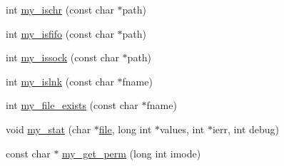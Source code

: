 \begin{DoxyCompactItemize}
\item 
int \hyperlink{C-M__system_8c_ae59ec13b3517e84ddd30a0cd5352a01d}{my\+\_\+ischr} (const char $\ast$path)
\item 
int \hyperlink{C-M__system_8c_ac4f0c51cc048efce7cc88a80c6ce50a4}{my\+\_\+isfifo} (const char $\ast$path)
\item 
int \hyperlink{C-M__system_8c_a090bd041de7e5661c0cb3dea61517283}{my\+\_\+issock} (const char $\ast$path)
\item 
int \hyperlink{C-M__system_8c_a5d15b99bbdd2c6d3e07c92b4bdebb732}{my\+\_\+islnk} (const char $\ast$fname)
\item 
int \hyperlink{C-M__system_8c_afc05a3ec2be734d741c384e752f96b90}{my\+\_\+file\+\_\+exists} (const char $\ast$fname)
\item 
void \hyperlink{C-M__system_8c_a93aa717690d60568cf019988f6434ba5}{my\+\_\+stat} (char $\ast$\hyperlink{what__overview_81_8txt_a447b56c526e8da30e0dc94673727ee25}{file}, long int $\ast$values, int $\ast$ierr, int debug)
\item 
const char $\ast$ \hyperlink{C-M__system_8c_a1ef2ab1c7375f6b130cee762e770a29a}{my\+\_\+get\+\_\+perm} (long int imode)
\end{DoxyCompactItemize}
